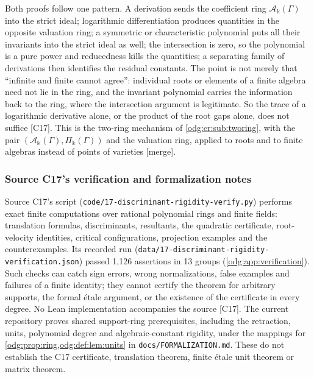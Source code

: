 \documentclass[11pt,oneside]{article}
\numberwithin{equation}{section}
\theoremstyle{definition}
\theoremstyle{remark}
\newcommand{\src}[1]{\textup{\textsf{\small[#1]}}}
\newcommand{\mergetag}{\textup{\textsf{\small[merge]}}}
\newcommand{\fn}[1]{\nolinkurl{#1}}
\newcommand{\crA}{\mathcal A_\Bbbk(\Gamma)}
\newcommand{\crP}{\Pi_\Bbbk(\Gamma)}
\begin{document}
Both proofs follow one pattern. A derivation sends the coefficient ring $\crA$ into the strict
ideal; logarithmic differentiation produces quantities in the opposite valuation ring; a
symmetric or characteristic polynomial puts all their invariants into the strict ideal as
well; the intersection is zero, so the polynomial is a pure power and reducedness kills the
quantities; a separating family of derivations then identifies the residual constants. The
point is not merely that ``infinite and finite cannot agree'': individual roots or elements
of a finite algebra need not lie in the ring, and the invariant polynomial carries the
information back to the ring, where the intersection argument is legitimate. So the trace
of a logarithmic derivative alone, or the product of the root gaps alone, does not suffice
\src{C17}. This is the two-ring mechanism of \cref{odg:cr:sub:tworing}, with the pair
$(\crA,\crP)$ and the valuation ring, applied to roots and to finite algebras instead of
points of varieties \mergetag.

\subsubsection{Source C17's verification and formalization notes}\label{odg:disc:sub:audit}

Source C17's script (\fn{code/17-discriminant-rigidity-verify.py}) performs exact finite
computations over rational polynomial rings and finite fields: translation formulas,
discriminants, resultants, the quadratic certificate, root-velocity identities, critical
configurations, projection examples and the counterexamples. Its recorded run
(\fn{data/17-discriminant-rigidity-verification.json}) passed 1,126 assertions in 13 groups
(\cref{odg:app:verification}). Such checks can catch sign errors, wrong normalizations,
false examples and failures of a finite identity; they cannot certify the theorem for
arbitrary supports, the formal \'etale argument, or the existence of the certificate in
every degree. No Lean implementation accompanies the source \src{C17}. The current
repository proves shared support-ring prerequisites, including the retraction, units,
polynomial degree and algebraic-constant rigidity, under the mappings for
\cref{odg:prop:ring,odg:def:lem:units} in \fn{docs/FORMALIZATION.md}. These do not establish
the C17 certificate, translation theorem, finite \'etale unit theorem or matrix theorem.
\end{document}
